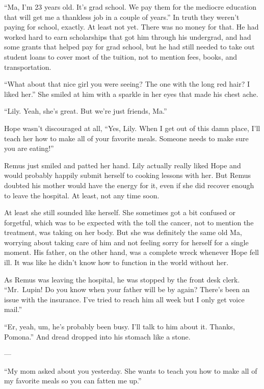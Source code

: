\documentclass[12pt,twoside,openright]{memoir}
\begin{document}
``Ma, I'm 23 years old. It's grad school. We pay them for the mediocre education that will get me a thankless job in a couple of years.'' In truth they weren't paying for school, exactly. At least not yet. There was no money for that. He had worked hard to earn scholarships that got him through his undergrad, and had some grants that helped pay for grad school, but he had still needed to take out student loans to cover most of the tuition, not to mention fees, books, and transportation. 

``What about that nice girl you were seeing? The one with the long red hair? I liked her.'' She smiled at him with a sparkle in her eyes that made his chest ache. 

``Lily. Yeah, she's great. But we're just friends, Ma.'' 

Hope wasn't discouraged at all, ``Yes, Lily. When I get out of this damn place, I'll teach her how to make all of your favorite meals. Someone needs to make sure you are eating!'' 

Remus just smiled and patted her hand. Lily actually really liked Hope and would probably happily submit herself to cooking lessons with her. But Remus doubted his mother would have the energy for it, even if she did recover enough to leave the hospital. At least, not any time soon.

At least she still sounded like herself. She sometimes got a bit confused or forgetful, which was to be expected with the toll the cancer, not to mention the treatment, was taking on her body. But she was definitely the same old Ma, worrying about taking care of him and not feeling sorry for herself for a single moment. His father, on the other hand, was a complete wreck whenever Hope fell ill. It was like he didn't know how to function in the world without her. 

As Remus was leaving the hospital, he was stopped by the front desk clerk. ``Mr.\ Lupin! Do you know when your father will be by again? There's been an issue with the insurance. I've tried to reach him all week but I only get voice mail.''

``Er, yeah, um, he's probably been busy. I'll talk to him about it. Thanks, Pomona.'' And dread dropped into his stomach like a stone. 

---

``My mom asked about you yesterday. She wants to teach you how to make all of my favorite meals so you can fatten me up.''
\end{document}
